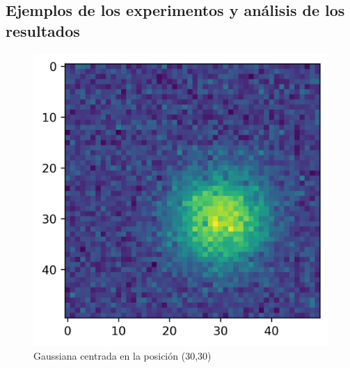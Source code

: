 \subsection{Ejemplos de los experimentos y análisis de los resultados}

\begin{figure}
	\centering
	\includegraphics{Graphics/gaussian-2d-experiment.png}
	\caption{Gaussiana centrada en la posición (30,30)} \label{fig:gaussian-example-experiment}
\end{figure}

